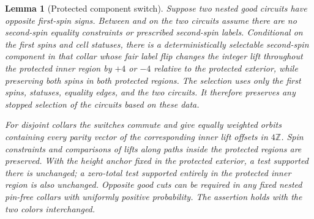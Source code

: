 \documentclass[11pt]{article}
\newcommand{\Z}{\mathbb Z}
\newtheorem{lemma}[theorem]{Lemma}
\theoremstyle{definition}
\theoremstyle{remark}
\numberwithin{equation}{section}
\begin{document}
\begin{lemma}[Protected component switch]\label{lem:collar-switch}
Suppose two nested good circuits have opposite first-spin signs. Between
and on the two circuits assume there are no second-spin equality
constraints or prescribed second-spin labels. Conditional on the
first spins and cell statuses, there is a deterministically selectable
second-spin component in that collar whose fair label flip changes the
integer lift throughout the protected inner region by $+4$ or $-4$
relative to the protected exterior, while preserving both spins in both
protected regions. The selection uses only the first spins, statuses,
equality edges, and the two circuits. It therefore preserves any stopped
selection of the circuits based on these data.

For disjoint collars the switches commute and give equally weighted
orbits containing every parity vector of the corresponding inner lift
offsets in $4\Z$. Spin constraints and comparisons of lifts along paths
inside the protected regions are preserved. With the height anchor fixed
in the protected exterior, a test supported there is unchanged; a
zero-total test supported entirely in the protected inner region is also
unchanged. Opposite good cuts can be required in any
fixed nested pin-free collars with uniformly positive probability.
The assertion holds with the two colors interchanged.
\end{lemma}
\end{document}
